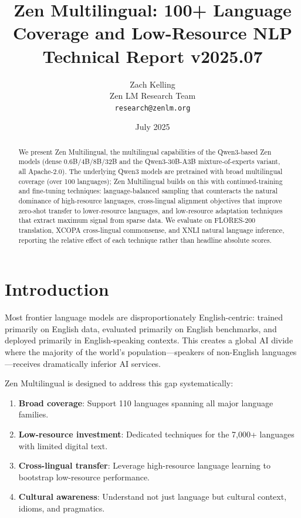 \documentclass[11pt,a4paper]{article}
\title{\textbf{Zen Multilingual: 100+ Language Coverage and Low-Resource NLP}\\
\large Technical Report v2025.07}
\author{Zach Kelling \\ Zen LM Research Team\\
\texttt{research@zenlm.org}}
\date{July 2025}
\begin{document}
\maketitle

\begin{abstract}
We present Zen Multilingual, the multilingual capabilities of the Qwen3-based Zen models (dense 0.6B/4B/8B/32B and the Qwen3-30B-A3B mixture-of-experts variant, all Apache-2.0). The underlying Qwen3 models are pretrained with broad multilingual coverage (over 100 languages); Zen Multilingual builds on this with continued-training and fine-tuning techniques: language-balanced sampling that counteracts the natural dominance of high-resource languages, cross-lingual alignment objectives that improve zero-shot transfer to lower-resource languages, and low-resource adaptation techniques that extract maximum signal from sparse data. We evaluate on FLORES-200 translation, XCOPA cross-lingual commonsense, and XNLI natural language inference, reporting the relative effect of each technique rather than headline absolute scores.
\end{abstract}

\section{Introduction}

Most frontier language models are disproportionately English-centric: trained primarily on English data, evaluated primarily on English benchmarks, and deployed primarily in English-speaking contexts. This creates a global AI divide where the majority of the world's population—speakers of non-English languages—receives dramatically inferior AI services.

Zen Multilingual is designed to address this gap systematically:

\begin{enumerate}
  \item \textbf{Broad coverage}: Support 110 languages spanning all major language families.
  \item \textbf{Low-resource investment}: Dedicated techniques for the 7,000+ languages with limited digital text.
  \item \textbf{Cross-lingual transfer}: Leverage high-resource language learning to bootstrap low-resource performance.
  \item \textbf{Cultural awareness}: Understand not just language but cultural context, idioms, and pragmatics.
\end{enumerate}
\end{document}
